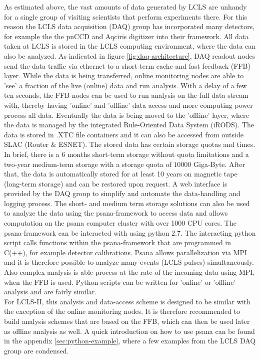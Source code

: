 As estimated above, the vast amounts of data generated by LCLS are unhandy for a single group of visiting scientists that perform experiments there. For this reason the LCLS data acquisition (DAQ) group has incorporated many detectors, for example the the pnCCD and Aqciris digitizer into their framework. All data taken at LCLS is stored in the LCLS computing environment, where the data can also be analyzed. As indicated in figure \ref{fig:daq-architecture}, DAQ readout nodes send the data traffic via ethernet to a short-term cache and fast feedback (FFB) layer. While the data is being transferred, online monitoring nodes are able to 'see' a fraction of the live (online) data and run analysis. With a delay of a few ten seconds, the FFB nodes can be used to run analysis on the full data stream with, thereby having 'online' and 'offline' data access and more computing power process all data. Eventually the data is being moved to the 'offline' layer, where the data is managed by the integrated Rule-Oriented Data System (iRODS). The data is stored in .XTC file containers and it can also be accessed from outside SLAC (Router \& ESNET). The stored data has certain storage quotas and times. In brief, there is a 6 months short-term storage without quota limitations and a two-year medium-term storage with a storage quota of $10 000$ Giga-Byte. After that, the data is automatically stored for at least 10 years on magnetic tape (long-term storage) and can be restored upon request. A web interface is provided by the DAQ group to simplify and automate the data-handling and logging process. The short- and medium term storage solutions can also be used to analyze the data using the psana-framework to access data and allows computation on the psana computer cluster with over 1000 CPU cores. The psana-framework can be interacted with using python 2.7. The interacting python script calls functions within the psana-framework that are programmed in C(++), for example detector calibrations. Psana allows parallelization via MPI and it is therefore possible to analyze many events (LCLS pulses) simultaneously. Also complex analysis is able process at the rate of the incoming data using MPI, when the FFB is used. Python scripts can be written for 'online' or 'offline' analysis and are fairly similar.\\
For LCLS-II, this analysis and data-access scheme is designed to be similar \citep{Amadeo-2016-SLAC} with the exception of the online monitoring nodes. It is therefore recommended to build analysis schemes that are based on the FFB, which can then be used later as offline analysis as well. A quick introduction on how to use psana can be found in the appendix \ref{sec:python-example}, where a few examples from the LCLS DAQ group are condensed.
%
%
%
